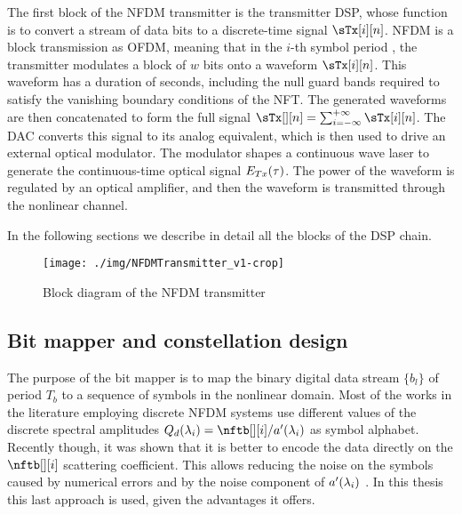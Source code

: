 The first block of the \ac{NFDM} transmitter is the transmitter \ac{DSP}, whose function
is to convert a stream of data bits to a discrete-time signal
$\sdTx[i]$.
\ac{NFDM} is a block transmission as \ac{OFDM}, meaning that in the $i$-th symbol period
, the transmitter modulates a block of $w$ bits onto a  waveform
$\sdTx[i]$. This waveform has a duration of \Ts{} seconds, including the null guard bands required
to satisfy the vanishing boundary conditions of the \ac{NFT}. The generated waveforms are then concatenated
to form the full signal $\sdTx =
\sum_{i=-\infty}^{+\infty}\sdTx[i]$. The \ac{DAC} converts this signal
to its analog equivalent, which is then used to drive an external optical
modulator. The modulator shapes a  continuous wave laser to generate the
continuous-time optical signal $\flds[Tx]$. The power of the waveform is
regulated by an optical amplifier, and then the waveform is transmitted through the
nonlinear channel.

In the following sections we describe in detail all the blocks of the \ac{DSP} chain.

\begin{figure}[t]
  \centering
  \texttt{[image: ./img/NFDMTransmitter\_v1-crop]}
  \caption{Block diagram of the \ac{NFDM} transmitter}
  \label{fig:nfdm_transmitter}
\end{figure}

\subsection{Bit mapper and constellation design}\label{sec:nfdm_bit_mapper}

The purpose of the bit mapper is to map the binary digital data stream $\{b_l\}$ of period $T_b$ to a
sequence of symbols in the nonlinear domain.
Most of the works in the literature employing discrete \ac{NFDM} systems use  different values of the discrete spectral amplitudes $\dnft[i] =
\nftb[][i]/\nftaderiv[i]$ \cite{le201764, geisler2016experimental} as
symbol alphabet. Recently though, it
was shown that it is better to encode the data directly on the $\nftb[][i]$
scattering coefficient. This allows reducing the noise on the symbols caused by
numerical errors \cite{Aref2016c} and by the noise component of $\nftaderiv[i]$
\cite{HongKong}. In this thesis this last approach is used, given the
advantages it offers.

